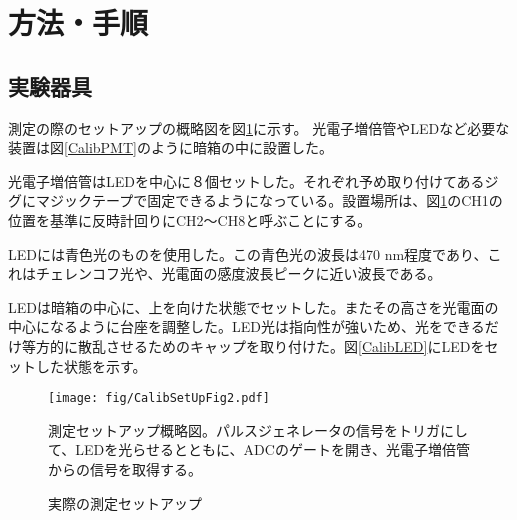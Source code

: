 \documentclass[11pt]{ltjsreport}
\newcommand{\figref}[1]{図\ref{#1}}
\begin{document}
\section{方法・手順}
\subsection{実験器具}
測定の際のセットアップの概略図を\figref{CalibSetUpFig}に示す。
光電子増倍管やLEDなど必要な装置は\figref{CalibPMT}のように暗箱の中に設置した。

光電子増倍管はLEDを中心に８個セットした。それぞれ予め取り付けてあるジグにマジックテープで固定できるようになっている。設置場所は、\figref{CalibSetUpFig}のCH1の位置を基準に反時計回りにCH2〜CH8と呼ぶことにする。

LEDには青色光のものを使用した。この青色光の波長は470 nm程度であり、これはチェレンコフ光や、光電面の感度波長ピークに近い波長である。

LEDは暗箱の中心に、上を向けた状態でセットした。またその高さを光電面の中心になるように台座を調整した。LED光は指向性が強いため、光をできるだけ等方的に散乱させるためのキャップを取り付けた。\figref{CalibLED}にLEDをセットした状態を示す。

\begin{figure}[htbp]
\centering
\texttt{[image: fig/CalibSetUpFig2.pdf]}
\caption[測定セットアップ概略図]{測定セットアップ概略図。パルスジェネレータの信号をトリガにして、LEDを光らせるとともに、ADCのゲートを開き、光電子増倍管からの信号を取得する。}
\label{CalibSetUpFig}
\end{figure}

\begin{figure}[!htbp]
  \begin{minipage}{0.47\textwidth}
  \end{minipage}
  \hfill
  \begin{minipage}{0.47\textwidth}
  \end{minipage}
    \caption{実際の測定セットアップ}
  \label{CalibSetUpPic}
\end{figure}
\end{document}
